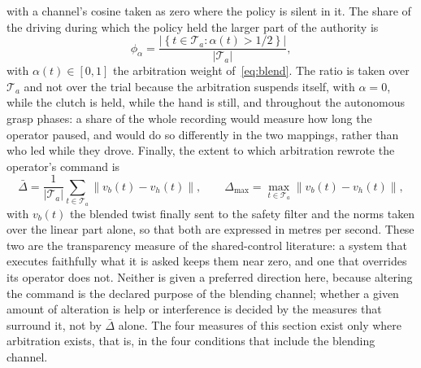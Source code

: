 with a channel's cosine taken as zero where the policy is silent in it. The share of the driving during which the policy held the larger part of the authority is
\begin{equation}
\phi_\alpha = \frac{\left|\left\{ t \in \mathcal{T}_a : \alpha(t) > 1/2 \right\}\right|}{\left|\mathcal{T}_a\right|},
\label{eq:mphi}
\end{equation}
with $\alpha(t) \in [0,1]$ the arbitration weight of~\eqref{eq:blend}. The ratio is taken over $\mathcal{T}_a$ and not over the trial because the arbitration suspends itself, with $\alpha = 0$, while the clutch is held, while the hand is still, and throughout the autonomous grasp phases: a share of the whole recording would measure how long the operator paused, and would do so differently in the two mappings, rather than who led while they drove. Finally, the extent to which arbitration rewrote the operator's command is
\begin{equation}
\bar{\Delta} = \frac{1}{|\mathcal{T}_a|} \sum_{t \in \mathcal{T}_a} \lVert v_b(t) - v_h(t) \rVert, \qquad
\Delta_{\max} = \max_{t \in \mathcal{T}_a} \lVert v_b(t) - v_h(t) \rVert,
\label{eq:mDelta}
\end{equation}
with $v_b(t)$ the blended twist finally sent to the safety filter and the norms taken over the linear part alone, so that both are expressed in metres per second. These two are the transparency measure of the shared-control literature: a system that executes faithfully what it is asked keeps them near zero, and one that overrides its operator does not. Neither is given a preferred direction here, because altering the command is the declared purpose of the blending channel; whether a given amount of alteration is help or interference is decided by the measures that surround it, not by $\bar{\Delta}$ alone. The four measures of this section exist only where arbitration exists, that is, in the four conditions that include the blending channel.


